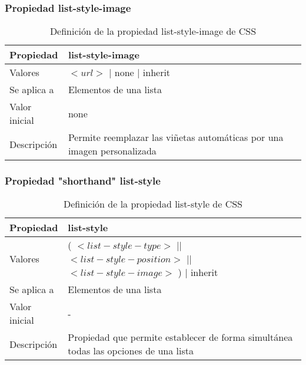 
\begin{frame}
\frametitle{Propiedad list-style-image}

\begin{center}
  \begin{table}
   \begin{tabular}{p{1.8cm}p{7.8cm}}
Propiedad & \bf{list-style-image} \\ \hline
Valores& $<url>$ | none | inherit \\ \hline
Se aplica a& Elementos de una lista \\ \hline
Valor inicial& none \\ \hline
Descripción& Permite reemplazar las viñetas automáticas por una imagen personalizada \\ \hline
  \end{tabular}
   \caption{Definición de la propiedad list-style-image de CSS}
 \end{table}
\end{center}


\end{frame}



\begin{frame}
\frametitle{Propiedad "shorthand" list-style}

\begin{center}
  \begin{table}
   \begin{tabular}{p{1.8cm}p{7.8cm}}
Propiedad & \bf{list-style} \\ \hline
Valores& ( $<list-style-type>$ || $<list-style-position>$ || $<list-style-image>$ ) | inherit \\ \hline
Se aplica a& Elementos de una lista \\ \hline
Valor inicial& - \\ \hline
Descripción& Propiedad que permite establecer de forma simultánea todas las opciones de una lista \\ \hline
  \end{tabular}
   \caption{Definición de la propiedad list-style de CSS}
 \end{table}
\end{center}


\end{frame}



